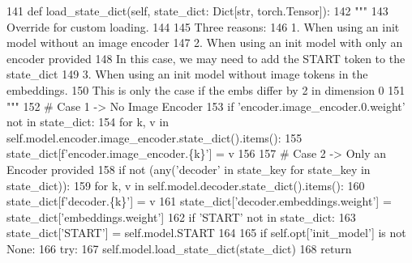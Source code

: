 \begin{DoxyCode}
141     \textcolor{keyword}{def }load\_state\_dict(self, state\_dict: Dict[str, torch.Tensor]):
142         \textcolor{stringliteral}{"""}
143 \textcolor{stringliteral}{        Override for custom loading.}
144 \textcolor{stringliteral}{}
145 \textcolor{stringliteral}{        Three reasons:}
146 \textcolor{stringliteral}{            1. When using an init model without an image encoder}
147 \textcolor{stringliteral}{            2. When using an init model with only an encoder provided}
148 \textcolor{stringliteral}{                In this case, we may need to add the START token to the state\_dict}
149 \textcolor{stringliteral}{            3. When using an init model without image tokens in the embeddings.}
150 \textcolor{stringliteral}{                This is only the case if the embs differ by 2 in dimension 0}
151 \textcolor{stringliteral}{        """}
152         \textcolor{comment}{# Case 1 -> No Image Encoder}
153         \textcolor{keywordflow}{if} \textcolor{stringliteral}{'encoder.image\_encoder.0.weight'} \textcolor{keywordflow}{not} \textcolor{keywordflow}{in} state\_dict:
154             \textcolor{keywordflow}{for} k, v \textcolor{keywordflow}{in} self.model.encoder.image\_encoder.state\_dict().items():
155                 state\_dict[f\textcolor{stringliteral}{'encoder.image\_encoder.\{k\}'}] = v
156 
157         \textcolor{comment}{# Case 2 -> Only an Encoder provided}
158         \textcolor{keywordflow}{if} \textcolor{keywordflow}{not} (any(\textcolor{stringliteral}{'decoder'} \textcolor{keywordflow}{in} state\_key \textcolor{keywordflow}{for} state\_key \textcolor{keywordflow}{in} state\_dict)):
159             \textcolor{keywordflow}{for} k, v \textcolor{keywordflow}{in} self.model.decoder.state\_dict().items():
160                 state\_dict[f\textcolor{stringliteral}{'decoder.\{k\}'}] = v
161             state\_dict[\textcolor{stringliteral}{'decoder.embeddings.weight'}] = state\_dict[\textcolor{stringliteral}{'embeddings.weight'}]
162             \textcolor{keywordflow}{if} \textcolor{stringliteral}{'START'} \textcolor{keywordflow}{not} \textcolor{keywordflow}{in} state\_dict:
163                 state\_dict[\textcolor{stringliteral}{'START'}] = self.model.START
164 
165         \textcolor{keywordflow}{if} self.opt[\textcolor{stringliteral}{'init\_model'}] \textcolor{keywordflow}{is} \textcolor{keywordflow}{not} \textcolor{keywordtype}{None}:
166             \textcolor{keywordflow}{try}:
167                 self.model.load\_state\_dict(state\_dict)
168                 \textcolor{keywordflow}{return}

\end{DoxyCode}
